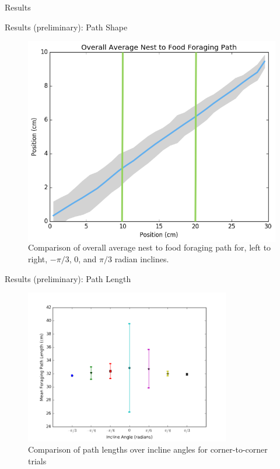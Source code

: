 \begin{section}{Results}
\begin{frame}{Results (preliminary): Path Shape}
\begin{figure}
\begin{columns}[T,onlytextwidth]
\includegraphics[width=\textwidth]{results/corner-to-corner-average_path_pidiv3.png}
\end{columns}
\caption{Comparison of overall average nest to food foraging path for, left to right, $-\pi/3$, $0$, and $\pi/3$ radian inclines.}
\end{figure}
\end{frame}


\begin{frame}{Results (preliminary): Path Length}
\begin{figure}
\includegraphics[width=0.8\textwidth]{results/corner-to-cornermeanforagingpathlength.png}
\caption{Comparison of path lengths over incline angles for corner-to-corner trials}
\end{figure}
\end{frame}



\end{section}
